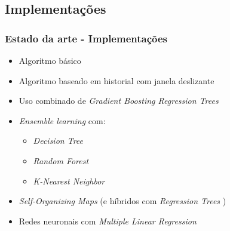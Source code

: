 \documentclass{beamer}
\begin{document}
\subsection[Implementacoes]{Implementações}
\begin{frame}[label={Implementacoes}]
\frametitle{Estado da arte - Implementações}

\let\oldfootnotesize\footnotesize
\renewcommand*{\footnotesize}{\oldfootnotesize\tiny}
\vspace{0.5cm}
\begin{itemize}
	\item Algoritmo básico
	\item Algoritmo baseado em historial com janela deslizante
	\item Uso combinado de \textit{Gradient Boosting Regression Trees}
	\item \textit{Ensemble learning}  com: 
		  \begin{itemize}
			  \item \textit{Decision Tree }
			  \item \textit{Random Forest}
			  \item \textit{K-Nearest Neighbor}
		  \end{itemize}
	\item \textit{Self-Organizing Maps} 
		  (e híbridos com \textit{Regression Trees} )
	\item Redes neuronais com \textit{Multiple Linear Regression} 
\end{itemize}
\vspace{0.5cm}

\renewcommand*{\footnotesize}{\oldfootnotesize}

\end{frame}
\end{document}
